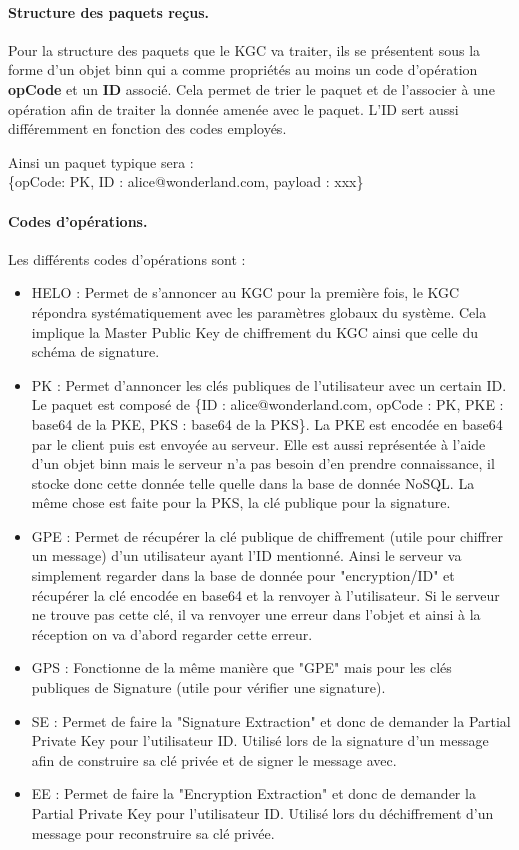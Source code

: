 \paragraph*{Structure des paquets reçus.}
Pour la structure des paquets que le KGC va traiter, ils se présentent sous la forme d'un objet binn qui a comme propriétés au moins un code d'opération \textbf{opCode} et un \textbf{ID} associé. Cela permet de trier le paquet et de l'associer à une opération afin de traiter la donnée amenée avec le paquet. L'ID sert aussi différemment en fonction des codes employés.

Ainsi un paquet typique sera :\\
\{opCode: PK, ID : alice@wonderland.com, payload : xxx\}
\paragraph*{Codes d'opérations.}
Les différents codes d'opérations sont :
\begin{itemize}
	\item HELO : Permet de s'annoncer au KGC pour la première fois, le KGC répondra systématiquement avec les paramètres globaux du système. Cela implique la Master Public Key de chiffrement du KGC ainsi que celle du schéma de signature. 
	\item PK : Permet d'annoncer les clés publiques de l'utilisateur avec un certain ID. Le paquet est composé de \{ID : alice@wonderland.com, opCode : PK, PKE : base64 de la PKE, PKS : base64 de la PKS\}. La PKE est encodée en base64 par le client puis est envoyée au serveur. Elle est aussi représentée à l'aide d'un objet binn mais le serveur n'a pas besoin d'en prendre connaissance, il stocke donc cette donnée telle quelle dans la base de donnée NoSQL. La même chose est faite pour la PKS, la clé publique pour la signature.
	\item GPE : Permet de récupérer la clé publique de chiffrement (utile pour chiffrer un message) d'un utilisateur ayant l'ID mentionné. Ainsi le serveur va simplement regarder dans la base de donnée pour "encryption/ID" et récupérer la clé encodée en base64 et la renvoyer à l'utilisateur. Si le serveur ne trouve pas cette clé, il va renvoyer une erreur dans l'objet et ainsi à la réception on va d'abord regarder cette erreur.
	\item GPS : Fonctionne de la même manière que "GPE" mais pour les clés publiques de Signature (utile pour vérifier une signature).
	\item SE : Permet de faire la "Signature Extraction" et donc de demander la Partial Private Key pour l'utilisateur ID. Utilisé lors de la signature d'un message afin de construire sa clé privée et de signer le message avec. 
	\item EE : Permet de faire la "Encryption Extraction" et donc de demander la Partial Private Key pour l'utilisateur ID. Utilisé lors du déchiffrement d'un message pour reconstruire sa clé privée.
\end{itemize}
